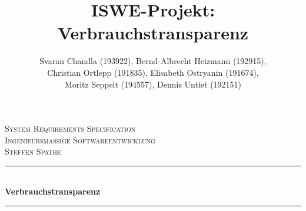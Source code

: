 \documentclass{article}
\begin{document}
\title{ISWE-Projekt: Verbrauchstransparenz}
\author{Svaran Chandla (193922), Bernd-Albrecht Heizmann (192915),
    \\Christian Ortlepp (191835), Elisabeth Ostryanin (191674), \\Moritz Seppelt (194557), Dennis Untiet (192151)}





\begin{titlepage} %
	\newcommand{\HRule}{\rule{\linewidth}{0.5mm}} %

	\center %



	\vspace*{6cm}
	\center\textsc{\huge System Requirements Specification
	}\\[1.5cm] %

	\textsc{\LARGE Ingenieursmäßige Softwareentwicklung}\\[0.5cm] %

	\textsc{\Large Steffen Späthe }\\[0.5cm] %


	\HRule\\[0.4cm]

	{\Huge\bfseries Verbrauchstransparenz}\\[0.4cm] %

	\HRule\\[1.5cm]



\end{titlepage}
\end{document}
